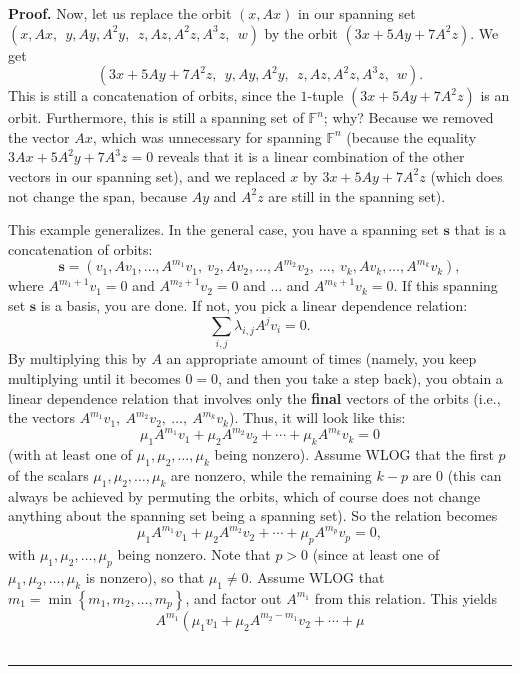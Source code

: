 \documentclass[numbers=enddot,12pt,final,onecolumn,notitlepage]{scrartcl}%
\numberwithin{exer}{subsection}
\theoremstyle{definition}
\newenvironment{proof}[1][Proof]{\noindent\textbf{#1.} }{\ \rule{0.5em}{0.5em}}
\let\sumnonlimits\sum
\renewcommand{\sum}{\sumnonlimits\limits}
\begin{document}
\begin{proof}
Now, let us replace the orbit $\left(  x,Ax\right)  $ in our spanning set
$\left(  x,Ax,\ \ y,Ay,A^{2}y,\ \ z,Az,A^{2}z,A^{3}z,\ \ w\right)  $ by the
orbit $\left(  3x+5Ay+7A^{2}z\right)  $. We get
\[
\left(  3x+5Ay+7A^{2}z,\ \ y,Ay,A^{2}y,\ \ z,Az,A^{2}z,A^{3}z,\ \ w\right)  .
\]
This is still a concatenation of orbits, since the $1$-tuple $\left(
3x+5Ay+7A^{2}z\right)  $ is an orbit. Furthermore, this is still a spanning
set of $\mathbb{F}^{n}$; why? Because we removed the vector $Ax$, which was
unnecessary for spanning $\mathbb{F}^{n}$ (because the equality $3Ax+5A^{2}%
y+7A^{3}z=0$ reveals that it is a linear combination of the other vectors in
our spanning set), and we replaced $x$ by $3x+5Ay+7A^{2}z$ (which does not
change the span, because $Ay$ and $A^{2}z$ are still in the spanning set).

This example generalizes. In the general case, you have a spanning set
$\mathbf{s}$ that is a concatenation of orbits:%
\[
\mathbf{s}=\left(  v_{1},Av_{1},\ldots,A^{m_{1}}v_{1},\ v_{2},Av_{2}%
,\ldots,A^{m_{2}}v_{2},\ \ldots,\ v_{k},Av_{k},\ldots,A^{m_{k}}v_{k}\right)
,
\]
where $A^{m_{1}+1}v_{1}=0$ and $A^{m_{2}+1}v_{2}=0$ and $\ldots$ and
$A^{m_{k}+1}v_{k}=0$. If this spanning set $\mathbf{s}$ is a basis, you are
done. If not, you pick a linear dependence relation:%
\[
\sum_{i,j}\lambda_{i,j}A^{j}v_{i}=0.
\]
By multiplying this by $A$ an appropriate amount of times (namely, you keep
multiplying until it becomes $0=0$, and then you take a step back), you obtain
a linear dependence relation that involves only the \textbf{final} vectors of
the orbits (i.e., the vectors $A^{m_{1}}v_{1},\ A^{m_{2}}v_{2},\ \ldots
,\ A^{m_{k}}v_{k}$). Thus, it will look like this:%
\[
\mu_{1}A^{m_{1}}v_{1}+\mu_{2}A^{m_{2}}v_{2}+\cdots+\mu_{k}A^{m_{k}}v_{k}=0
\]
(with at least one of $\mu_{1},\mu_{2},\ldots,\mu_{k}$ being nonzero). Assume
WLOG that the first $p$ of the scalars $\mu_{1},\mu_{2},\ldots,\mu_{k}$ are
nonzero, while the remaining $k-p$ are $0$ (this can always be achieved by
permuting the orbits, which of course does not change anything about the
spanning set being a spanning set). So the relation becomes%
\[
\mu_{1}A^{m_{1}}v_{1}+\mu_{2}A^{m_{2}}v_{2}+\cdots+\mu_{p}A^{m_{p}}v_{p}=0,
\]
with $\mu_{1},\mu_{2},\ldots,\mu_{p}$ being nonzero. Note that $p>0$ (since at
least one of $\mu_{1},\mu_{2},\ldots,\mu_{k}$ is nonzero), so that $\mu
_{1}\neq0$. Assume WLOG that $m_{1}=\min\left\{  m_{1},m_{2},\ldots
,m_{p}\right\}  $, and factor out $A^{m_{1}}$ from this relation. This yields%
\[
A^{m_{1}}\left(  \mu_{1}v_{1}+\mu_{2}A^{m_{2}-m_{1}}v_{2}+\cdots+\mu
\]
\end{proof}
\end{document}
